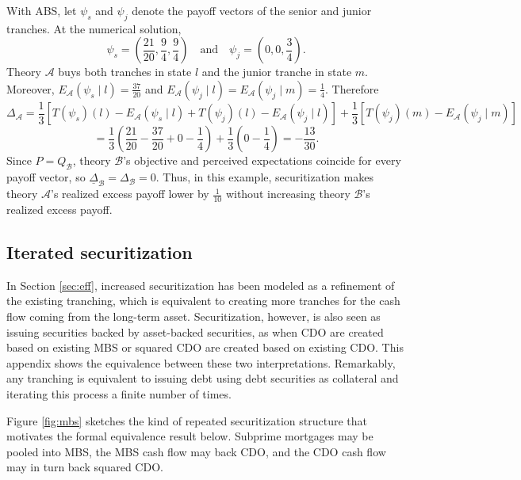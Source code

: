 \documentclass[11pt]{article}
\theoremstyle{plain}
\begin{document}
With ABS, let $\psi_s$ and $\psi_j$ denote the payoff vectors of the senior and junior tranches. At the numerical solution,
\[
\psi_s=\left(\frac{21}{20},\frac{9}{4},\frac{9}{4}\right)
\quad\text{and}\quad
\psi_j=\left(0,0,\frac{3}{4}\right).
\]
Theory $\mathcal{A}$ buys both tranches in state $l$ and the junior tranche in state $m$. Moreover, $E_{\mathcal{A}}(\psi_s\mid l)=\frac{37}{20}$ and $E_{\mathcal{A}}(\psi_j\mid l)=E_{\mathcal{A}}(\psi_j\mid m)=\frac{1}{4}$. Therefore
\[
\Delta_{\mathcal{A}}
=\frac{1}{3}\left[T(\psi_s)(l)-E_{\mathcal{A}}(\psi_s\mid l)
+T(\psi_j)(l)-E_{\mathcal{A}}(\psi_j\mid l)\right]
+\frac{1}{3}\left[T(\psi_j)(m)-E_{\mathcal{A}}(\psi_j\mid m)\right]
\]
\[
=\frac{1}{3}\left(\frac{21}{20}-\frac{37}{20}+0-\frac{1}{4}\right)
+\frac{1}{3}\left(0-\frac{1}{4}\right)
=-\frac{13}{30}.
\]
Since $P=Q_{\mathcal{B}}$, theory $\mathcal{B}$'s objective and perceived expectations coincide for every payoff vector, so $\underline{\Delta}_{\mathcal{B}}=\Delta_{\mathcal{B}}=0$. Thus, in this example, securitization makes theory $\mathcal{A}$'s realized excess payoff lower by $\frac{1}{10}$ without increasing theory $\mathcal{B}$'s realized excess payoff.

\subsection{Iterated securitization} \label{sec:is}

In Section \ref{sec:eff}, increased securitization has been modeled as a refinement of the existing tranching, which is equivalent to creating more tranches for the cash flow coming from the long-term asset. Securitization, however, is also seen as issuing securities backed by asset-backed securities, as when CDO are created based on existing MBS or squared CDO are created based on existing CDO. This appendix shows the equivalence between these two interpretations. Remarkably, any tranching is equivalent to issuing debt using debt securities as collateral and iterating this process a finite number of times.

Figure \ref{fig:mbs} sketches the kind of repeated securitization structure that motivates the formal equivalence result below. Subprime mortgages may be pooled into MBS, the MBS cash flow may back CDO, and the CDO cash flow may in turn back squared CDO.
\end{document}
